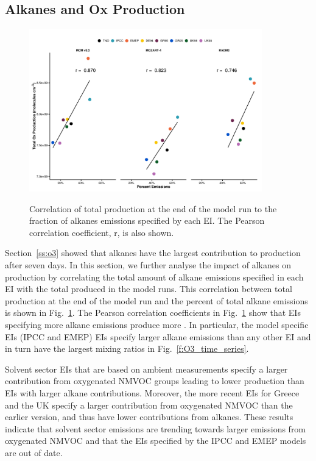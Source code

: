 \documentclass[14pt]{extarticle}
\begin{document}
\subsection{Alkanes and Ox Production}
\begin{figure}
    \centering
    \caption{Correlation of total  production at the end of the model run to the fraction of alkanes emissions specified by each EI. The Pearson correlation coefficient, r, is also shown.}
    \includegraphics[width=0.9\textwidth]{Pictures/Ox_production_vs_type_emission_fraction_all_mechanisms}
    \label{f:correlations}
    \vspace{-2mm}
\end{figure} 
Section~\ref{ss:o3} showed that alkanes have the largest contribution to  production after seven days.
In this section, we further analyse the impact of alkanes on  production by correlating the total amount of alkane emissions specified in each EI with the total  produced in the model runs.  
This correlation between total  production at the end of the model run and the percent of total alkane emissions is shown in Fig.~\ref{f:correlations}.
The Pearson correlation coefficients in Fig.~\ref{f:correlations} show that EIs specifying more alkane emissions produce more .
In particular, the model specific EIs (IPCC and EMEP) EIs specify larger alkane emissions than any other EI and in turn have the largest  mixing ratios in Fig.~\ref{f:O3_time_series}.

Solvent sector EIs that are based on ambient measurements specify a larger contribution from oxygenated NMVOC groups leading to lower  production than EIs with larger alkane contributions.
Moreover, the more recent EIs for Greece and the UK specify a larger contribution from oxygenated NMVOC than the earlier version, and thus have lower contributions from alkanes.
These results indicate that solvent sector emissions are trending towards larger emissions from oxygenated NMVOC and that the EIs specified by the IPCC and EMEP models are out of date.
\end{document}
